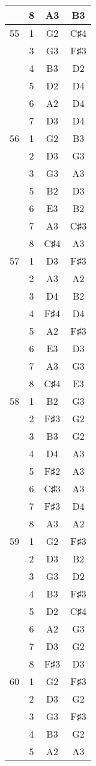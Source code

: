 \documentclass{article}
\begin{document}
\begin{longtable}{|c|c|c|c|}
  & 8 & A3 & B3 \\ 
\hline
55 & 1 & G2 & C♯4 \\ 
  & 3 & G3 & F♯3 \\ 
  & 4 & B3 & D2 \\ 
  & 5 & D2 & D4 \\ 
  & 6 & A2 & D4 \\ 
  & 7 & D3 & D4 \\ 
\hline
56 & 1 & G2 & B3 \\ 
  & 2 & D3 & G3 \\ 
  & 3 & G3 & A3 \\ 
  & 5 & B2 & D3 \\ 
  & 6 & E3 & B2 \\ 
  & 7 & A3 & C♯3 \\ 
  & 8 & C♯4 & A3 \\ 
\hline
57 & 1 & D3 & F♯3 \\ 
  & 2 & A3 & A2 \\ 
  & 3 & D4 & B2 \\ 
  & 4 & F♯4 & D4 \\ 
  & 5 & A2 & F♯3 \\ 
  & 6 & E3 & D3 \\ 
  & 7 & A3 & G3 \\ 
  & 8 & C♯4 & E3 \\ 
\hline
58 & 1 & B2 & G3 \\ 
  & 2 & F♯3 & G2 \\ 
  & 3 & B3 & G2 \\ 
  & 4 & D4 & A3 \\ 
  & 5 & F♯2 & A3 \\ 
  & 6 & C♯3 & A3 \\ 
  & 7 & F♯3 & D4 \\ 
  & 8 & A3 & A2 \\ 
\hline
59 & 1 & G2 & F♯3 \\ 
  & 2 & D3 & B2 \\ 
  & 3 & G3 & D2 \\ 
  & 4 & B3 & F♯3 \\ 
  & 5 & D2 & C♯4 \\ 
  & 6 & A2 & G3 \\ 
  & 7 & D3 & G2 \\ 
  & 8 & F♯3 & D3 \\ 
\hline
60 & 1 & G2 & F♯3 \\ 
  & 2 & D3 & G2 \\ 
  & 3 & G3 & F♯3 \\ 
  & 4 & B3 & G2 \\ 
  & 5 & A2 & A3 \\ 

\end{longtable}
\end{document}
